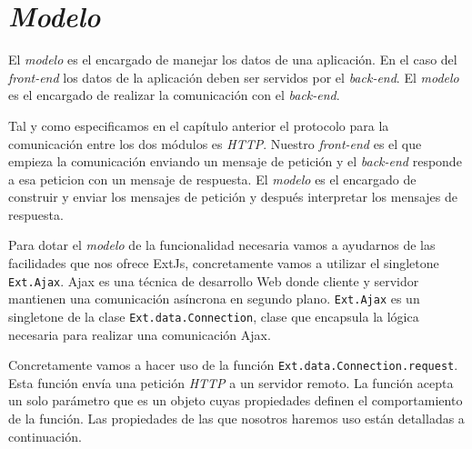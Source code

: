 \section{\emph{Modelo}}
	El \emph{modelo} es el encargado de manejar los datos de una aplicación. En el caso del \emph{front-end} los datos de la aplicación deben ser
	servidos por el \emph{back-end}. El \emph{modelo} es el encargado de realizar la comunicación con el \emph{back-end}. 
	\par
	Tal y como especificamos en el  capítulo anterior el protocolo para la comunicación entre los dos módulos es \emph{HTTP}. Nuestro
	\emph{front-end} es el que empieza la comunicación enviando un mensaje de petición y el \emph{back-end} responde a esa peticion con un mensaje
	de respuesta. El \emph{modelo} es el encargado de construir y enviar los mensajes de petición y después interpretar los mensajes de respuesta.
	\par
	Para dotar el \emph{modelo} de la funcionalidad necesaria vamos a ayudarnos de las facilidades que nos ofrece ExtJs, concretamente vamos a
	utilizar el singletone \texttt{Ext.Ajax}. Ajax\cite{AjaxWiki} es una técnica de desarrollo Web donde cliente y servidor mantienen una
	comunicación asíncrona en segundo plano. \texttt{Ext.Ajax} es un singletone de la clase \texttt{Ext.data.Connection}, clase que encapsula la
	lógica necesaria para realizar una comunicación Ajax. 
	\par
	Concretamente vamos a hacer uso de la función \texttt{Ext.data.Connection.request}. Esta función envía una petición \emph{HTTP} a un servidor
	remoto. La función acepta un solo parámetro que es un objeto cuyas propiedades definen el comportamiento de la función. Las propiedades de las
	que nosotros haremos uso están detalladas a continuación. 
